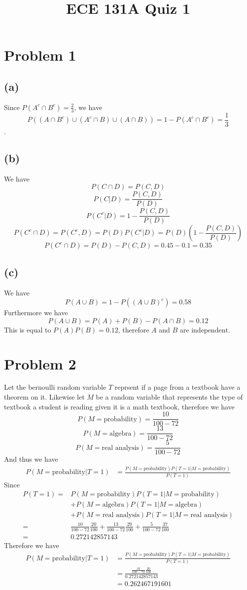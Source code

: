 
\title{ECE 131A Quiz 1}

\maketitle
\section*{Problem 1}
\subsection*{(a)}
Since $P(A^c\cap B^c)=\frac{2}{3}$, we have 
$$P((A\cap B^c)\cup (A^c\cap B)\cup (A\cap B))=1-P(A^c\cap B^c)=\boxed{\frac{1}{3}}$$.
\subsection*{(b)}
We have
$$P(C\cap D )=P(C,D)$$
$$P(C|D)=\frac{P(C,D)}{P(D)}$$
$$P(C^c|D)=1-\frac{P(C,D)}{P(D)}$$
$$P(C^c\cap D )=P(C^c,D)=P(D)P(C^c|D)=P(D)(1-\frac{P(C,D)}{P(D)})$$
$$P(C^c\cap D )=P(D)-P(C,D)=0.45-0.1=\boxed{0.35}$$
\subsection*{(c)}
We have
$$P(A\cup B)=1-P\left((A\cup B)^c\right)=0.58$$
Furthermore we have 
$$P(A\cup B)=P(A)+P(B)-P(A\cap B)=0.12$$
This is equal to $P(A)P(B)=0.12$, therefore $A$ and $B$ are $\boxed{\text{independent}}$.

\section*{Problem 2}
Let the bernoulli random variable $T$ reprsent if a page from a 
textbook have a theorem on it. Likewise let $M$ be a  random variable that represents the type of 
textbook a student is reading given it is a math textbook, therefore we have
$$P(M=\text{probability})=\frac{10}{100-72}$$
$$P(M=\text{algebra})=\frac{13}{100-72}$$
$$P(M=\text{real analysis})=\frac{5}{100-72}$$
And thus we have
\begin{align*}
P(M=\text{probability}|T=1)&=\frac{P(M=\text{probability})P(T=1|M=\text{probability})}{P(T=1)}
\end{align*}
Since
\begin{align*}
    P(T=1)=&P(M=\text{probability})P(T=1|M=\text{probability})
\\&+P(M=\text{algebra})P(T=1|M=\text{algebra})\\&+
P(M=\text{real analysis})P(T=1|M=\text{real analysis})\\
=&\frac{10}{100-72}\frac{20}{100}+\frac{13}{100-72}\frac{29}{100}+\frac{5}{100-72}\frac{37}{100}\\
=&0.272142857143
\end{align*}
Therefore we have
\begin{align*}
    P(M=\text{probability}|T=1)&=\frac{P(M=\text{probability})P(T=1|M=\text{probability})}{P(T=1)}\\
    &=\frac{\frac{10}{100-72}\frac{20}{100}}{0.272142857143}\\
    &=\boxed{0.262467191601}
\end{align*}
